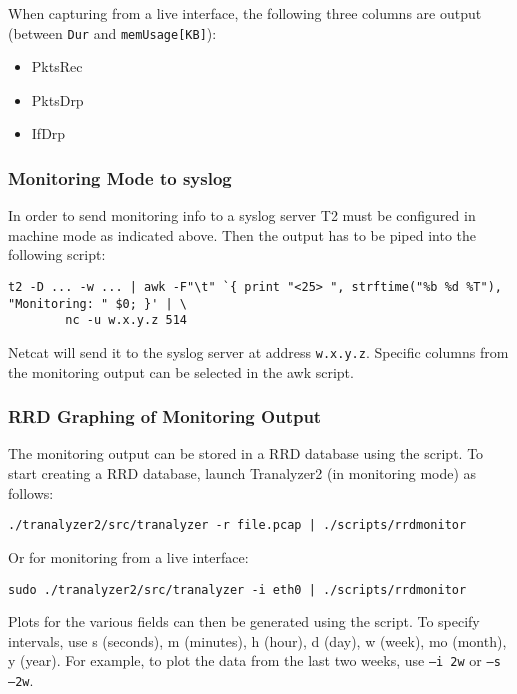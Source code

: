 When capturing from a live interface, the following three columns are output (between {\tt Dur} and {\tt memUsage[KB]}):
\begin{multicols}{3}
    \begin{itemize}
        \item PktsRec
        \item PktsDrp
        \item IfDrp
    \end{itemize}
\end{multicols}

\subsubsection{Monitoring Mode to syslog}
In order to send monitoring info to a syslog server T2 must be configured in machine mode as indicated above.
Then the output has to be piped into the following script:

\begin{lstlisting}
t2 -D ... -w ... | awk -F"\t" `{ print "<25> ", strftime("%b %d %T"), "Monitoring: " $0; }' | \
        nc -u w.x.y.z 514
\end{lstlisting}

Netcat will send it to the syslog server at address {\tt w.x.y.z}.
Specific columns from the monitoring output can be selected in the awk script.

\subsubsection{RRD Graphing of Monitoring Output}
The monitoring output can be stored in a RRD database using the  script.
To start creating a RRD database, launch Tranalyzer2 (in monitoring mode) as follows:
\begin{center}
    {\tt ./tranalyzer2/src/tranalyzer -r file.pcap | ./scripts/rrdmonitor}
\end{center}
Or for monitoring from a live interface:
\begin{center}
    {\tt sudo ./tranalyzer2/src/tranalyzer -i eth0 | ./scripts/rrdmonitor}
\end{center}

Plots for the various fields can then be generated using the  script.
To specify intervals, use s (seconds), m (minutes), h (hour), d (day), w (week), mo (month), y (year).
For example, to plot the data from the last two weeks, use {\tt --i 2w} or {\tt --s --2w}.

